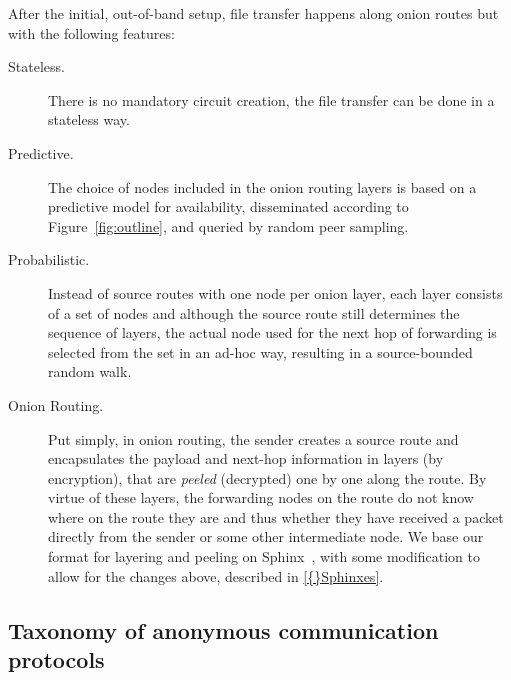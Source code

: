 After the initial, out-of-band setup, file transfer happens along
onion routes but with the following features:

\begin{description}
\item [Stateless.] There is no mandatory circuit creation, the file transfer can be
  done in a stateless way. 
\item [Predictive.] The choice of nodes included in the onion routing
  layers is based on a predictive model for availability, disseminated
  according to Figure~\ref{fig:outline}, and queried by random peer sampling.
\item [Probabilistic.] Instead of source routes with one node per onion layer, each
  layer consists of a set of nodes and although the source route still
  determines the sequence of layers, the actual node used for the next
  hop of forwarding is selected from the set in an ad-hoc way,
  resulting in a source-bounded random walk.
\item[Onion Routing.] Put simply, in onion routing, the sender creates
  a source route and 
  encapsulates the payload and next-hop information in layers (by
  encryption), that are \emph{peeled} (decrypted) one by one along the
  route. By virtue of these layers, the forwarding nodes on the
  route do not know where on the route they are and thus whether they
  have received a packet directly from the sender or some other
  intermediate node. We base our format for layering and peeling on
  Sphinx~\cite{Sphinx}, with some modification to allow for the
  changes above, described in \cref{{}Sphinxes}.
\end{description} 

\subsection{Taxonomy of anonymous communication protocols}

